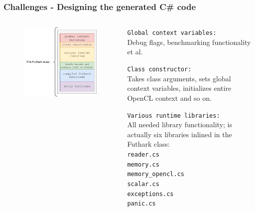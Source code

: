 \documentclass[10pt, compress, usenames, dvipsnames]{beamer}
\begin{document}
\begin{frame}[fragile]
  \frametitle{Challenges - Designing the generated C\# code}
  \begin{columns}
    \begin{column}{.48\textwidth}
  \begin{figure}
    \centering
    \includegraphics[scale=0.75]{./images/futhark_class}
    \hspace{1em}
  \end{figure}
    \end{column}
    \begin{column}{.48\textwidth}
      \begin{overprint}

      {
      \texttt{Global context variables:}\\
      Debug flags, benchmarking functionality et al.
      }

      {
      \texttt{Class constructor:}\\
      Takes class arguments, sets global context variables, initializes entire
      OpenCL context and so on.
      }

      {
      \texttt{Various runtime libraries:}\\
      All needed library functionality; is actually six libraries inlined in the
      Futhark class:\\
      {\small
        \texttt{reader.cs} \\
        \texttt{memory.cs} \\
        \texttt{memory\_opencl.cs} \\
        \texttt{scalar.cs} \\
        \texttt{exceptions.cs} \\
        \texttt{panic.cs}
      }
      }


\end{overprint}
\end{column}
\end{columns}
\end{frame}
\end{document}
